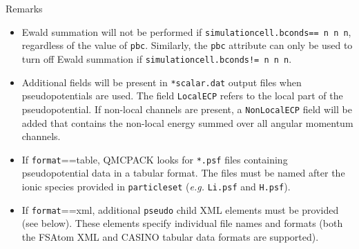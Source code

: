 Remarks
\begin{itemize}
  \item{Ewald summation will not be performed if \texttt{simulationcell.bconds== n n n}, regardless of the value of \texttt{pbc}.  Similarly, the \texttt{pbc} attribute can only be used to turn off Ewald summation if \texttt{simulationcell.bconds!= n n n}.}
  \item{Additional fields will be present in \texttt{*scalar.dat} output files when pseudopotentials are used.  The field \texttt{LocalECP} refers to the local part of the pseudopotential.  If non-local channels are present, a \texttt{NonLocalECP} field will be added that contains the non-local energy summed over all angular momentum channels.}
  \item{If \texttt{format}==table}, QMCPACK looks for \texttt{*.psf} files containing pseudopotential data in a tabular format.  The files must be named after the ionic species provided in \texttt{particleset} (\emph{e.g.} \texttt{Li.psf} and \texttt{H.psf}). 
  \item{If \texttt{format}==xml, additional \texttt{pseudo} child XML elements must be provided (see below).  These elements specify individual file names and formats (both the FSAtom XML and CASINO tabular data formats are supported).}
\end{itemize}



